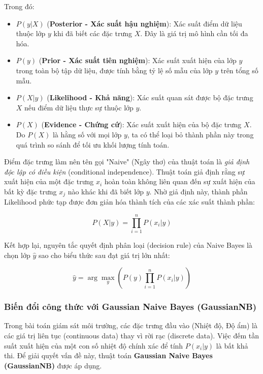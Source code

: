 Trong đó:
\begin{itemize}
    \item $P(y|X)$ (\textbf{Posterior - Xác suất hậu nghiệm}): Xác suất điểm dữ liệu thuộc lớp $y$ khi đã biết các đặc trưng $X$. Đây là giá trị mô hình cần tối đa hóa.
    \item $P(y)$ (\textbf{Prior - Xác suất tiên nghiệm}): Xác suất xuất hiện của lớp $y$ trong toàn bộ tập dữ liệu, được tính bằng tỷ lệ số mẫu của lớp $y$ trên tổng số mẫu.
    \item $P(X|y)$ (\textbf{Likelihood - Khả năng}): Xác suất quan sát được bộ đặc trưng $X$ nếu điểm dữ liệu thực sự thuộc lớp $y$.
    \item $P(X)$ (\textbf{Evidence - Chứng cứ}): Xác suất xuất hiện của bộ đặc trưng $X$. Do $P(X)$ là hằng số với mọi lớp $y$, ta có thể loại bỏ thành phần này trong quá trình so sánh để tối ưu khối lượng tính toán.
\end{itemize}

Điểm đặc trưng làm nên tên gọi "Naive" (Ngây thơ) của thuật toán là \textit{giả định độc lập có điều kiện} (conditional independence). Thuật toán giả định rằng sự xuất hiện của một đặc trưng $x_i$ hoàn toàn không liên quan đến sự xuất hiện của bất kỳ đặc trưng $x_j$ nào khác khi đã biết lớp $y$. Nhờ giả định này, thành phần Likelihood phức tạp được đơn giản hóa thành tích của các xác suất thành phần:

\begin{equation}
P(X|y) = \prod_{i=1}^{n} P(x_i|y)
\end{equation}

Kết hợp lại, nguyên tắc quyết định phân loại (decision rule) của Naive Bayes là chọn lớp $\hat{y}$ sao cho biểu thức sau đạt giá trị lớn nhất:

\begin{equation}
\hat{y} = \arg\max_{y} \left( P(y) \prod_{i=1}^{n} P(x_i|y) \right)
\label{eq:naive_bayes_base}
\end{equation}

\subsubsection{Biến đổi công thức với Gaussian Naive Bayes (GaussianNB)}
Trong bài toán giám sát môi trường, các đặc trưng đầu vào (Nhiệt độ, Độ ẩm) là các giá trị liên tục (continuous data) thay vì rời rạc (discrete data). Việc đếm tần suất xuất hiện của một con số nhiệt độ chính xác để tính $P(x_i|y)$ là bất khả thi. Để giải quyết vấn đề này, thuật toán \textbf{Gaussian Naive Bayes (GaussianNB)} được áp dụng.

